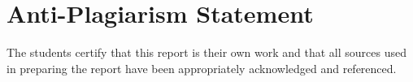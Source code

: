 \chapter*{Anti-Plagiarism Statement}
The students certify that this report is their own work and that all sources used in preparing the report have been appropriately acknowledged and referenced.
